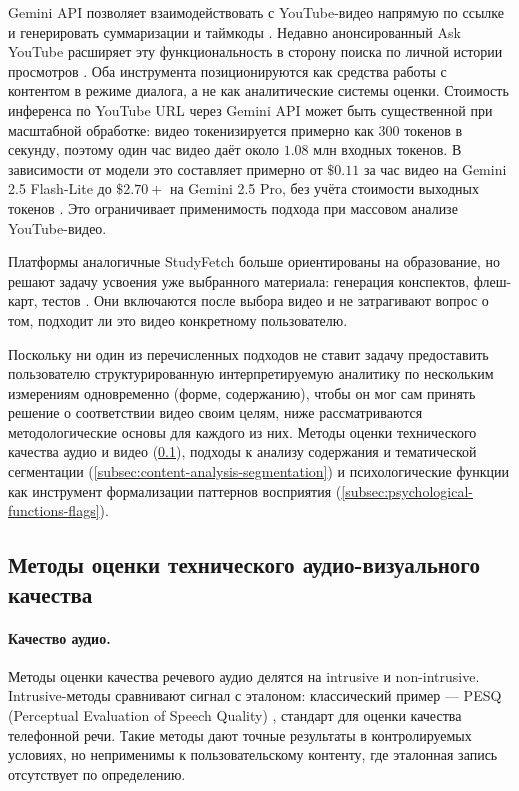 Gemini API позволяет взаимодействовать с YouTube-видео напрямую по ссылке и генерировать суммаризации и таймкоды \cite{googledevelopers2024gemini2video}.
Недавно анонсированный Ask YouTube расширяет эту функциональность в сторону поиска по личной истории просмотров \cite{peters2026askyoutube,thekeyword2026askyoutube}.
Оба инструмента позиционируются как средства работы с контентом в режиме диалога, а не как аналитические системы оценки. Стоимость инференса по YouTube URL через Gemini API
может быть существенной при масштабной обработке:
видео токенизируется примерно как $300$ токенов в секунду, поэтому один час видео даёт около $1.08$ млн входных токенов.
В зависимости от модели это составляет примерно от $\$0.11$ за час видео на Gemini 2.5 Flash-Lite до $\$2.70+$ на Gemini 2.5 Pro, без учёта стоимости выходных токенов \cite{googledevelopers2026geminivideounderstanding}.
Это ограничивает применимость подхода при массовом анализе YouTube-видео.

Платформы аналогичные StudyFetch больше ориентированы на образование, но решают задачу усвоения уже выбранного материала: генерация конспектов, флеш-карт,
тестов \cite{studyfetch2024documentation,laxuai2026flashcardcomparison}.
Они включаются после выбора видео и не затрагивают вопрос о том, подходит ли это видео конкретному пользователю.

Поскольку ни один из перечисленных подходов не ставит задачу 
предоставить пользователю структурированную интерпретируемую аналитику по нескольким измерениям одновременно (форме, содержанию),
чтобы он мог сам принять решение о соответствии видео своим целям, ниже рассматриваются методологические основы для каждого из них.
Методы оценки технического качества аудио и видео (\cref{subsec:technical-av-quality}),
подходы к анализу содержания и тематической сегментации (\cref{subsec:content-analysis-segmentation})
и психологические функции как инструмент формализации паттернов восприятия (\cref{subsec:psychological-functions-flags}).

\subsection{Методы оценки технического аудио-визуального качества}
\label{subsec:technical-av-quality}


\paragraph{Качество аудио.}


Методы оценки качества речевого аудио делятся на intrusive и non-intrusive.
Intrusive-методы сравнивают сигнал с эталоном: классический пример — PESQ (Perceptual Evaluation of Speech Quality) \cite{itut2001pesq},
стандарт для оценки качества телефонной речи. Такие методы дают точные результаты в контролируемых условиях, но неприменимы к пользовательскому контенту,
где эталонная запись отсутствует по определению.

